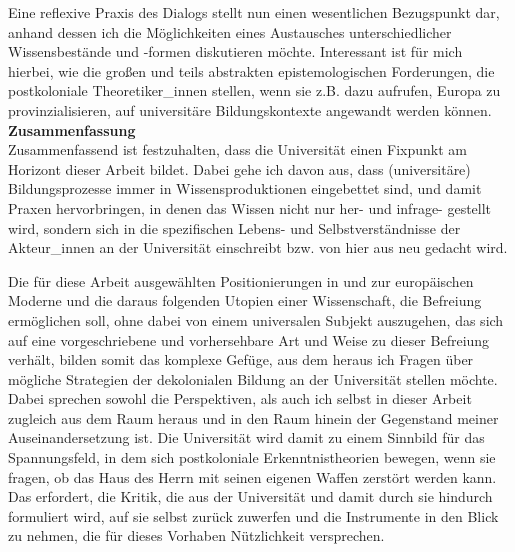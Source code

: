 Eine reflexive Praxis des Dialogs stellt nun einen wesentlichen Bezugspunkt
dar, anhand dessen ich die Möglichkeiten eines Austausches unterschiedlicher
Wissensbestände und -formen diskutieren möchte. Interessant ist für mich
hierbei, wie die großen und teils abstrakten epistemologischen Forderungen, die
postkoloniale Theoretiker\_innen stellen, wenn sie z.B. dazu aufrufen, Europa zu
provinzialisieren,\footnotemark{} auf universitäre Bildungskontexte angewandt werden
können.\\

\textbf{\large Zusammenfassung}\\
Zusammenfassend ist festzuhalten, dass die
Universität einen Fixpunkt am Horizont dieser Arbeit bildet. Dabei gehe ich
davon aus, dass (universitäre) Bildungsprozesse immer in Wissensproduktionen
eingebettet sind, und damit Praxen hervorbringen, in denen das Wissen nicht nur
her- und infrage- gestellt wird, sondern sich in die spezifischen Lebens- und
Selbstverständnisse der Akteur\_innen an der Universität einschreibt bzw. von
hier aus neu gedacht wird.

Die für diese Arbeit ausgewählten Positionierungen in und zur europäischen
Moderne und die daraus folgenden Utopien einer Wissenschaft, die Befreiung
ermöglichen soll, ohne dabei von einem universalen Subjekt auszugehen, das sich
auf eine vorgeschriebene und vorhersehbare Art und Weise zu dieser Befreiung
verhält, bilden somit das komplexe Gefüge, aus dem heraus ich Fragen über
mögliche Strategien der dekolonialen Bildung an der Universität stellen möchte.
Dabei sprechen sowohl die Perspektiven, als auch ich selbst in dieser Arbeit
zugleich aus dem Raum heraus und in den Raum hinein der Gegenstand meiner
Auseinandersetzung ist. Die Universität wird damit zu einem Sinnbild für das
Spannungsfeld, in dem sich postkoloniale Erkenntnistheorien bewegen, wenn sie
fragen, ob das Haus des Herrn mit seinen eigenen Waffen zerstört werden
kann.\footnotemark {} Das erfordert, die Kritik, die aus der Universität und damit durch sie hindurch formuliert wird, auf sie selbst zurück zuwerfen und die Instrumente in den Blick zu nehmen, die für dieses Vorhaben Nützlichkeit versprechen.

